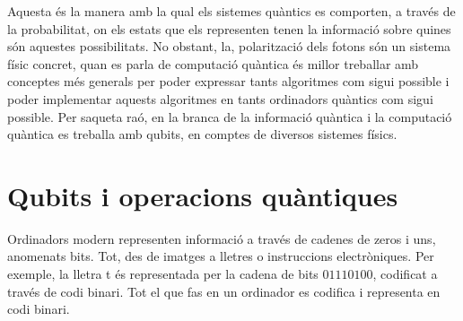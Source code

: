 Aquesta és la manera amb la qual els sistemes quàntics es comporten, a través de la probabilitat, on els estats que els representen tenen la informació sobre quines són aquestes possibilitats. 
No obstant, la, polarització dels fotons són un sistema físic concret, quan es parla de computació quàntica és millor treballar amb conceptes més generals per poder expressar tants algoritmes com sigui possible i poder implementar aquests algoritmes en tants ordinadors quàntics com sigui possible. Per saqueta raó, en la branca de la informació quàntica i la computació quàntica es treballa amb qubits, en comptes de diversos sistemes físics. 

\section{Qubits i operacions quàntiques}
Ordinadors modern representen informació a través de cadenes de zeros i uns, anomenats bits. Tot, des de imatges a lletres o instruccions electròniques. Per exemple, la lletra t és representada per la cadena de bits $01110100$, codificat a través de codi binari. Tot el que fas en un ordinador es codifica i representa en codi binari. 

